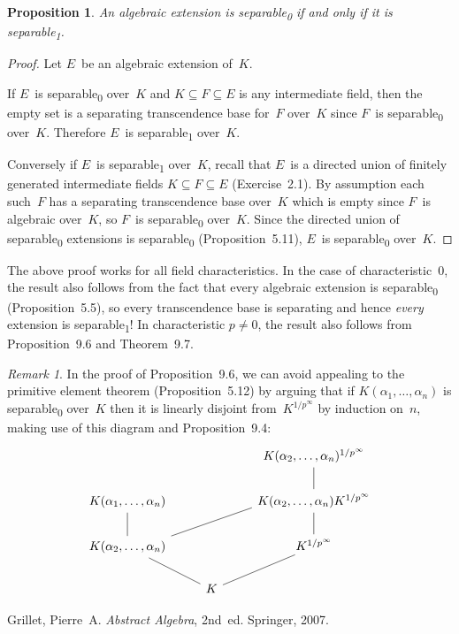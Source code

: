 \documentclass[letterpaper,12pt]{article}
\newcommand{\sub}{\textsubscript}
\theoremstyle{definition}
\theoremstyle{remark}
\newtheorem*{rmk}{Remark}
\theoremstyle{plain}
\newtheorem*{prop}{Proposition}
\begin{document}
\begin{prop}
An algebraic extension is separable\sub{0} if and only if it is separable\sub{1}.
\end{prop}
\begin{proof}
Let \(E\)~be an algebraic extension of~\(K\).

If \(E\)~is separable\sub{0} over~\(K\) and \(K\subseteq F\subseteq E\) is any intermediate field, then the empty set is a separating transcendence base for~\(F\) over~\(K\) since \(F\)~is separable\sub{0} over~\(K\). Therefore \(E\)~is separable\sub{1} over~\(K\).

Conversely if \(E\)~is separable\sub{1} over~\(K\), recall that \(E\)~is a directed union of finitely generated intermediate fields \(K\subseteq F\subseteq E\) (Exercise~2.1). By assumption each such~\(F\) has a separating transcendence base over~\(K\) which is empty since \(F\)~is algebraic over~\(K\), so \(F\)~is separable\sub{0} over~\(K\). Since the directed union of separable\sub{0} extensions is separable\sub{0} (Proposition~5.11), \(E\)~is separable\sub{0} over~\(K\).
\end{proof}
\noindent The above proof works for all field characteristics. In the case of characteristic~\(0\), the result also follows from the fact that every algebraic extension is separable\sub{0} (Proposition~5.5), so every transcendence base is separating and hence \emph{every} extension is separable\sub{1}! In characteristic \(p\ne 0\), the result also follows from Proposition~9.6 and Theorem~9.7.

\begin{rmk}
In the proof of Proposition~9.6, we can avoid appealing to the primitive element theorem (Proposition~5.12) by arguing that if \(K(\alpha_1,\ldots,\alpha_n)\) is separable\sub{0} over~\(K\) then it is linearly disjoint from~\(K^{1/p^{\infty}}\) by induction on~\(n\), making use of this diagram and Proposition~9.4:
\[\begin{tikzcd}
							&	&K(\alpha_2,\ldots,\alpha_n)^{1/p^{\infty}}\\
K(\alpha_1,\ldots,\alpha_n)	&	&K(\alpha_2,\ldots,\alpha_n)K^{1/p^{\infty}}\\
K(\alpha_2,\ldots,\alpha_n)	&	&K^{1/p^{\infty}}\\
							&K
\arrow[no head, from=2-3, to=1-3]
\arrow[no head, from=3-1, to=2-1]
\arrow[no head, from=3-1, to=2-3, start anchor=north east, end anchor={[yshift=4pt]south west}]
\arrow[no head, from=3-3, to=2-3]
\arrow[no head, from=4-2, to=3-1]
\arrow[no head, from=4-2, to=3-3]
\end{tikzcd}\]
\end{rmk}

\begin{thebibliography}{0}
 Grillet, Pierre~A. \textit{Abstract Algebra}, 2nd~ed. Springer, 2007.
\end{thebibliography}
\end{document}
